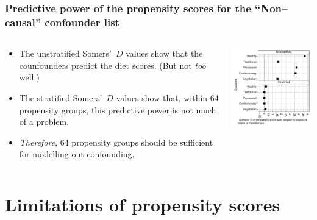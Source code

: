 \documentclass[11pt]{beamer}
\begin{document}
\begin{frame}
\frametitle{Predictive power of the propensity scores for the ``Non--causal'' confounder list}

\begin{columns}[t]
\begin{column}{48mm}
\begin{itemize}
\item<2-> The unstratified Somers'~$D$ values show that the counfounders predict the diet scores.
(But not \textit{too} well.)
\item<3-> The stratified Somers'~$D$ values show that, within 64 propensity groups,
this predictive power is not much of a problem.
\item<4-> \textit{Therefore}, 64 propensity groups should be sufficient for modelling out confounding.
\end{itemize}
\end{column}
\begin{column}[T]{80mm}
\includegraphics[width=76mm]{figseq2.pdf}
\end{column}
\end{columns}

\end{frame}

\section{Limitations of propensity scores}
\end{document}
